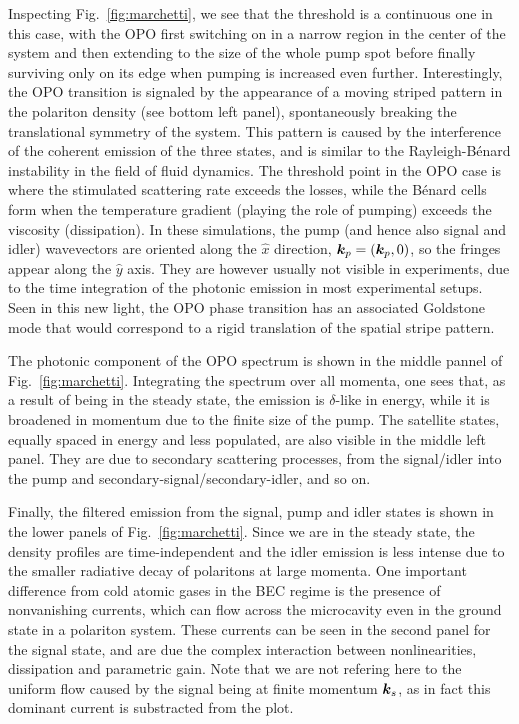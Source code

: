Inspecting Fig.~\ref{fig:marchetti}, we see that the threshold is a
continuous one in this case, with the OPO first switching on in a
narrow region in the center of the system and then extending to the
size of the whole pump spot before finally surviving only on its edge
when pumping is increased even further. Interestingly, the OPO
transition is signaled by the appearance of a moving striped pattern
in the polariton density (see bottom left panel), spontaneously
breaking the translational symmetry of the system. This pattern is
caused by the interference of the coherent emission of the three
states, and is similar to the Rayleigh-B\'{e}nard instability in the
field of fluid dynamics. The threshold point in the OPO case is where
the stimulated scattering rate exceeds the losses, while the
B\'{e}nard cells form when the temperature gradient (playing the role
of pumping) exceeds the viscosity (dissipation). In these simulations,
the pump (and hence also signal and idler) wavevectors are oriented
along the $\hat{x}$ direction, $\bm{k}_p = (\bm{k}_p, 0)$, so the fringes
appear along the $\hat{y}$ axis. They are however usually not visible
in experiments, due to the time integration of the photonic emission
in most experimental setups. Seen in this new light, the OPO phase
transition has an associated Goldstone mode that would correspond to a
rigid translation of the spatial stripe pattern.

The photonic component of the OPO spectrum is shown in the middle
pannel of Fig.~\ref{fig:marchetti}. Integrating the spectrum over all
momenta, one sees that, as a result of being in the steady state, the
emission is $\delta$-like in energy, while it is broadened in momentum
due to the finite size of the pump. The satellite states, equally
spaced in energy and less populated, are also visible in the middle
left panel. They are due to secondary scattering processes, from the
signal/idler into the pump and secondary-signal/secondary-idler, and
so on.

Finally, the filtered emission from the signal, pump and idler states
is shown in the lower panels of Fig.~\ref{fig:marchetti}. Since we are
in the steady state, the density profiles are time-independent and
the idler emission is less intense due to the smaller radiative decay
of polaritons at large momenta. One important difference from cold
atomic gases in the BEC regime is the presence of nonvanishing
currents, which can flow across the microcavity even in the ground
state in a polariton system. These currents can be seen in the second
panel for the signal state, and are due the complex interaction
between nonlinearities, dissipation and parametric gain. Note that we
are not refering here to the uniform flow caused by the signal being
at finite momentum $\bm{k}_s$, as in fact this dominant current is
substracted from the plot.

